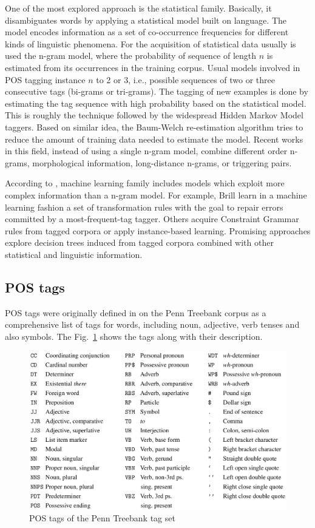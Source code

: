 One of the most explored approach is the statistical family.
Basically, it disambiguates words by applying a statistical model
built on language. The model encodes information as a set of
co-occurrence frequencies for different kinds of linguistic phenomena.
For the acquisition of statistical data usually is used the n-gram
model, where the probability of sequence of length $n$ is estimated
from its occurrences in the training corpus. Usual models involved in
POS tagging instance $n$ to 2 or 3, i.e., possible sequences of two or
three consecutive tags (bi-grams or tri-grams). The tagging of new
examples is done by estimating the tag sequence with high probability
based on the statistical model. This is roughly the technique followed
by the widespread Hidden Markov Model taggers. Based on similar idea,
the Baum-Welch re-estimation algorithm tries to reduce the amount of
training data needed to estimate the model. Recent works in this
field, instead of using a single n-gram model, combine different order
n-grams, morphological information, long-distance n-grams, or
triggering pairs.

According to \cite{marquez2000machine}, machine learning family
includes models which exploit more complex information than a n-gram
model. For example, Brill \etal{} learn in a machine learning fashion
a set of transformation rules with the goal to repair errors committed
by a most-frequent-tag tagger. Others acquire Constraint Grammar rules
from tagged corpora or apply instance-based learning. Promising
approaches explore decision trees induced from tagged corpora combined
with other statistical and linguistic information.

\subsection{POS tags}

POS tags were originally defined in \cite{marcus1993building} on the
Penn Treebank corpus as a comprehensive list of tags for words,
including noun, adjective, verb tenses and also symbols. The
Fig.~\ref{fig:pos-tags} shows the tags along with their description.

\begin{figure}
  \centering
  \includegraphics[width=.8\textwidth]{figures/pos-tags.png}
  \caption[POS tags]{POS tags of the Penn Treebank tag set \cite{marcus1993building}}
  \label{fig:pos-tags}
\end{figure}

